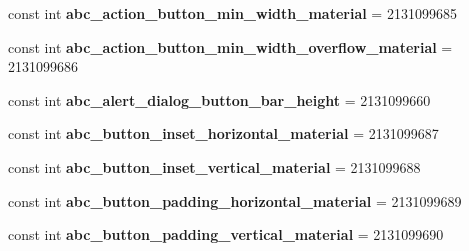 \begin{DoxyCompactItemize}
\mbox{\label{class_pinned_app_1_1_droid_1_1_resource_1_1_dimension_a7e9c893435690fffd0b584e2dab495d1}} 
const int {\bfseries abc\+\_\+action\+\_\+button\+\_\+min\+\_\+width\+\_\+material} = 2131099685
\item 
\mbox{\label{class_pinned_app_1_1_droid_1_1_resource_1_1_dimension_ae99b202dc07647984ac408014a68d717}} 
const int {\bfseries abc\+\_\+action\+\_\+button\+\_\+min\+\_\+width\+\_\+overflow\+\_\+material} = 2131099686
\item 
\mbox{\label{class_pinned_app_1_1_droid_1_1_resource_1_1_dimension_a556ddc0408b7ef1536481902c26f4d61}} 
const int {\bfseries abc\+\_\+alert\+\_\+dialog\+\_\+button\+\_\+bar\+\_\+height} = 2131099660
\item 
\mbox{\label{class_pinned_app_1_1_droid_1_1_resource_1_1_dimension_ac20309fb9a90cc93a72ca36a2cdb4ff0}} 
const int {\bfseries abc\+\_\+button\+\_\+inset\+\_\+horizontal\+\_\+material} = 2131099687
\item 
\mbox{\label{class_pinned_app_1_1_droid_1_1_resource_1_1_dimension_ace77e8db78104c223a82a016b2a7b7be}} 
const int {\bfseries abc\+\_\+button\+\_\+inset\+\_\+vertical\+\_\+material} = 2131099688
\item 
\mbox{\label{class_pinned_app_1_1_droid_1_1_resource_1_1_dimension_a79aa5e11c73a458517e5d4f5b0b1188e}} 
const int {\bfseries abc\+\_\+button\+\_\+padding\+\_\+horizontal\+\_\+material} = 2131099689
\item 
\mbox{\label{class_pinned_app_1_1_droid_1_1_resource_1_1_dimension_a4ca85579466d54fc2fb1b92de865f8b6}} 
const int {\bfseries abc\+\_\+button\+\_\+padding\+\_\+vertical\+\_\+material} = 2131099690
\item 
\mbox{\label{class_pinned_app_1_1_droid_1_1_resource_1_1_dimension_a16524192d2bdf35a7cc94a4f3a782163}} 

\end{DoxyCompactItemize}
